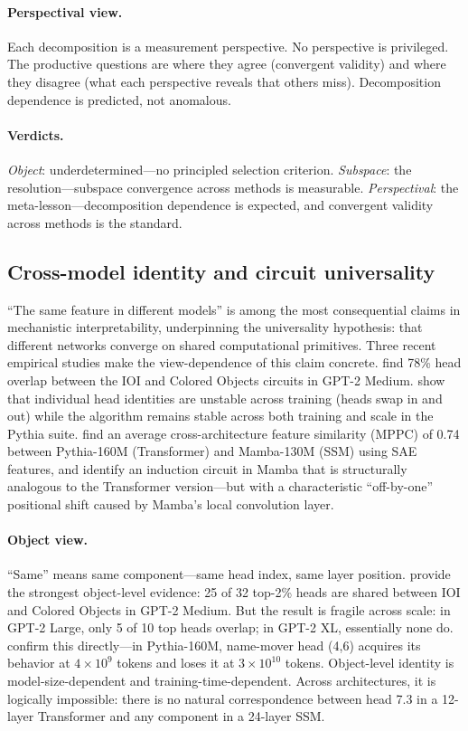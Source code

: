 \documentclass{article}
\begin{document}
\paragraph{Perspectival view.}
Each decomposition is a measurement perspective. No perspective is
privileged. The productive questions are where they agree (convergent
validity) and where they disagree (what each perspective reveals that
others miss). Decomposition dependence is predicted, not anomalous.

\paragraph{Verdicts.}
\emph{Object}: underdetermined---no principled selection criterion.
\emph{Subspace}: the resolution---subspace convergence across methods is
measurable.
\emph{Perspectival}: the meta-lesson---decomposition dependence is
expected, and convergent validity across methods is the standard.


\subsection{Cross-model identity and circuit universality}\label{app:cs_cross}

``The same feature in different models'' is among the most consequential
claims in mechanistic interpretability, underpinning the universality
hypothesis: that different networks converge on shared computational
primitives. Three recent empirical studies make the view-dependence of
this claim concrete. \citet{merullo2024} find 78\% head overlap between
the IOI and Colored Objects circuits in GPT-2 Medium.
\citet{tigges2024} show that individual head identities are unstable
across training (heads swap in and out) while the algorithm remains
stable across both training and scale in the Pythia suite.
\citet{wang2024universality} find an average cross-architecture feature
similarity (MPPC) of 0.74 between Pythia-160M (Transformer) and
Mamba-130M (SSM) using SAE features, and identify an induction circuit
in Mamba that is structurally analogous to the Transformer version---but
with a characteristic ``off-by-one'' positional shift caused by Mamba's
local convolution layer.

\paragraph{Object view.}
``Same'' means same component---same head index, same layer position.
\citet{merullo2024} provide the strongest object-level evidence: 25 of
32 top-2\% heads are shared between IOI and Colored Objects in GPT-2
Medium. But the result is fragile across scale: in GPT-2 Large, only 5
of 10 top heads overlap; in GPT-2 XL, essentially none do.
\citet{tigges2024} confirm this directly---in Pythia-160M, name-mover
head (4,6) acquires its behavior at $4 \times 10^9$ tokens and loses it
at $3 \times 10^{10}$ tokens. Object-level identity is
model-size-dependent and training-time-dependent. Across architectures,
it is logically impossible: there is no natural correspondence between
head 7.3 in a 12-layer Transformer and any component in a 24-layer SSM.
\end{document}
